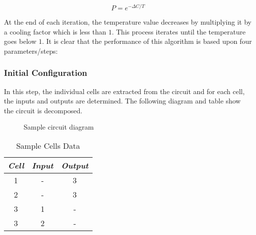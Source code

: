 \documentclass[conference]{IEEEtran}
\newcommand\T{\rule{0pt}{2.6ex}}       %
\newcommand\B{\rule[-1.2ex]{0pt}{0pt}} %
\begin{document}
    \begin{equation}
        P = e^{-\Delta C/T}
    \end{equation}

At the end of each iteration, the temperature value decreases by multiplying it by a cooling factor which is less than $1$. This process iterates until the temperature goes below $1$. It is clear that the performance of this algorithm is based upon four parameters\slash steps:

\subsubsection{Initial Configuration}
In this step, the individual cells are extracted from the circuit and for each cell, the inputs and outputs are determined. The following diagram and table show the circuit is decomposed.
\begin{figure}[H]
    \centering
    \caption{Sample circuit diagram}
\end{figure}

\begin{table}[H]
    \caption{Sample Cells Data}
    \centering
     \begin{tabular}{||c c c||} 
     \hline
     \textit{\textbf{Cell}} & \textit{\textbf{Input}} & \textit{\textbf{Output}} \T \B \\ 
     \hline
     \hline
     1 & - & 3 \T \B \\ 
     \hline
     2 & - & 3 \T \B \\
     \hline
     3 & 1 & - \T \B \\
     \hline
     3 & 2 & - \T \B \\
     \hline
     \end{tabular}
     \label{table1}
\end{table}
\end{document}
